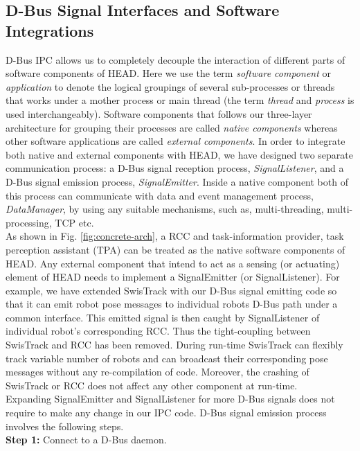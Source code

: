 \documentclass{ifacconf}
\begin{document}
\subsection{D-Bus Signal Interfaces and Software Integrations}
D-Bus IPC allows us to completely decouple the interaction of different parts of software components of HEAD. Here we use the term {\em software component} or {\em application} to denote the logical groupings of several sub-processes or threads that works under a mother process or main thread (the term {\em thread} and {\em process} is used interchangeably). Software components that follows our three-layer architecture for grouping their processes are called {\em native components} whereas other software applications are called {\em external components}. In order to integrate both native and external components with HEAD, we have designed two separate communication process: a D-Bus signal reception process, {\em SignalListener}, and a D-Bus signal emission process, {\em SignalEmitter}. Inside a native component both of this process can communicate with data and event management process, {\em DataManager}, by using any suitable mechanisms, such as, multi-threading, multi-processing, TCP etc.\\
%
As shown in Fig. \ref{fig:concrete-arch}, a RCC and task-information provider, task perception assistant (TPA) can be treated as the native software components of HEAD. Any external component that intend to act as a sensing (or actuating) element of HEAD needs to implement a SignalEmitter (or SignalListener). For example, we have extended SwisTrack  with our D-Bus signal emitting code so that it can emit robot pose messages to individual robots D-Bus path under a common interface. This emitted signal is then caught by SignalListener of individual robot's corresponding RCC. Thus the tight-coupling between SwisTrack and RCC has been removed. During run-time SwisTrack can flexibly track variable number of robots and can broadcast their corresponding pose messages without any re-compilation of code. Moreover, the crashing of SwisTrack or RCC does not affect any other component at run-time.\\
Expanding SignalEmitter and SignalListener for more D-Bus signals does not require to make any change in our IPC code. D-Bus signal emission process involves the following steps.\\
\textbf{Step 1:} Connect to a D-Bus daemon. \\
\end{document}
